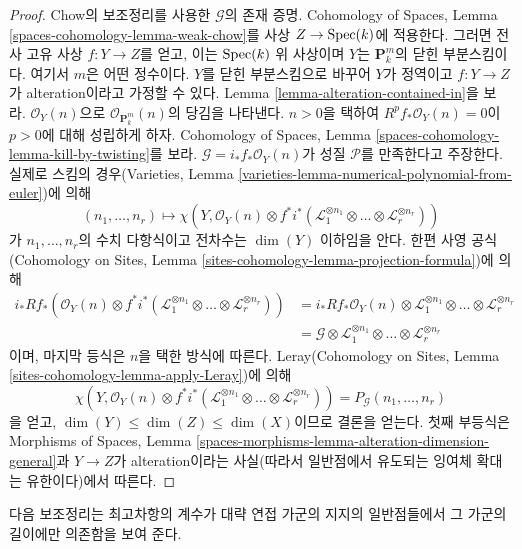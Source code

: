 \begin{proof}
\medskip\noindent
Chow의 보조정리를 사용한 $\mathcal{G}$의 존재 증명.
Cohomology of Spaces, Lemma \ref{spaces-cohomology-lemma-weak-chow}를 사상
$Z \to \mathop{\mathrm{Spec}}(k)$에 적용한다. 그러면 전사 고유 사상 $f : Y \to Z$를 얻고,
이는 $\mathop{\mathrm{Spec}}(k)$ 위 사상이며 $Y$는 $\mathbf{P}^m_k$의 닫힌 부분스킴이다.
여기서 $m$은 어떤 정수이다. $Y$를 닫힌 부분스킴으로 바꾸어
$Y$가 정역이고 $f : Y \to Z$가 alteration이라고 가정할 수 있다. Lemma
\ref{lemma-alteration-contained-in}을 보라.
$\mathcal{O}_Y(n)$으로 $\mathcal{O}_{\mathbf{P}^m_k}(n)$의 당김을 나타낸다.
$n > 0$을 택하여 $R^pf_*\mathcal{O}_Y(n) = 0$이 $p > 0$에 대해 성립하게 하자.
Cohomology of Spaces, Lemma
\ref{spaces-cohomology-lemma-kill-by-twisting}를 보라.
$\mathcal{G} = i_*f_*\mathcal{O}_Y(n)$가 성질 $\mathcal{P}$를 만족한다고
주장한다.
실제로 스킴의 경우(Varieties, Lemma
\ref{varieties-lemma-numerical-polynomial-from-euler})에 의해
$$
(n_1, \ldots, n_r)
\longmapsto
\chi(Y, \mathcal{O}_Y(n) \otimes
f^*i^*(\mathcal{L}_1^{\otimes n_1} \otimes \ldots \otimes
\mathcal{L}_r^{\otimes n_r}))
$$
가 $n_1, \ldots, n_r$의 수치 다항식이고 전차수는 $\dim(Y)$ 이하임을 안다.
한편 사영 공식(Cohomology on Sites, Lemma
\ref{sites-cohomology-lemma-projection-formula})에 의해
\begin{align*}
i_*Rf_*\left(
\mathcal{O}_Y(n) \otimes
f^*i^*(\mathcal{L}_1^{\otimes n_1} \otimes \ldots \otimes
\mathcal{L}_r^{\otimes n_r})\right)
& =
i_*Rf_*\mathcal{O}_Y(n) \otimes
\mathcal{L}_1^{\otimes n_1} \otimes \ldots \otimes
\mathcal{L}_r^{\otimes n_r} \\
& =
\mathcal{G} \otimes \mathcal{L}_1^{\otimes n_1} \otimes \ldots \otimes
\mathcal{L}_r^{\otimes n_r}
\end{align*}
이며, 마지막 등식은 $n$을 택한 방식에 따른다. Leray(Cohomology on Sites,
Lemma \ref{sites-cohomology-lemma-apply-Leray})에 의해
$$
\chi(Y, \mathcal{O}_Y(n) \otimes
f^*i^*(\mathcal{L}_1^{\otimes n_1} \otimes \ldots \otimes
\mathcal{L}_r^{\otimes n_r})) =
P_\mathcal{G}(n_1, \ldots, n_r)
$$
을 얻고, $\dim(Y) \leq \dim(Z) \leq \dim(X)$이므로 결론을 얻는다. 첫째
부등식은 Morphisms of Spaces, Lemma
\ref{spaces-morphisms-lemma-alteration-dimension-general}과
$Y \to Z$가 alteration이라는 사실(따라서 일반점에서 유도되는 잉여체 확대는
유한이다)에서 따른다.
\end{proof}

\noindent
다음 보조정리는 최고차항의 계수가 대략 연접 가군의 지지의 일반점들에서 그
가군의 길이에만 의존함을 보여 준다.


